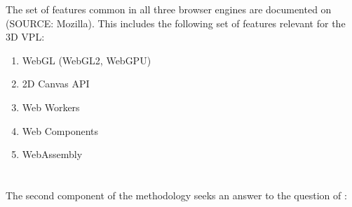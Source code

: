 The set of features common in all three browser engines are documented on (SOURCE: Mozilla). 
This includes the following set of features relevant for the 3D VPL:
\begin{enumerate}[-]
  \item WebGL (WebGL2, WebGPU)
  \item 2D Canvas API
  \item Web Workers
  \item Web Components
  \item WebAssembly
\end{enumerate}





\section{\mySubRQTwoTitle} 
\label{sec:method-two}
The second component of the methodology seeks an answer to the question of \mySubRQTwoTitle: \mySubRQTwo

